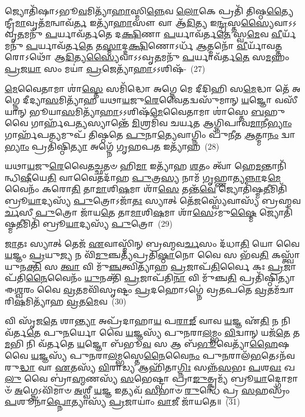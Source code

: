 𑌜𑍍𑌯𑍋𑌤𑌿᳴𑌷𑌾\-𑌽𑌭𑍂\-\ul{𑌵}\-𑌮𑌿𑌤𑍍𑌯𑌾᳴\-\ul{𑌹𑌾}\-𑌸𑍍𑌮𑌿\-\ul{𑌨𑍍𑌨𑍇}\-𑌵 \ul{𑌲𑍋}\-𑌕𑍇 𑌪𑍍𑌰𑌤𑌿᳴ 𑌤𑌿𑌷𑍍𑌠\-\ul{𑌤𑍍𑌯𑍈}\-𑌨𑍍𑌦𑍍𑌰𑍀\-\ul{𑌮𑌾}\-\-𑌵𑍃𑌤᳴\-\ul{𑌮}\-𑌨𑍍𑌵𑌾𑌵᳴\-\ul{𑌰𑍍𑌤} 𑌇𑌤𑍍𑌯𑌾᳴\-\ul{𑌹𑌾}\-𑌸𑍗 𑌵𑌾 𑌆᳴\-\ul{𑌦𑌿}\-𑌤𑍍𑌯 𑌇\-\ul{𑌨𑍍𑌦𑍍𑌰}\-𑌸𑍍𑌤\-\ul{𑌸𑍍𑌯𑍈}\-𑌵𑌾\-𑌽\-𑌽\-𑌵𑍃\-\ul{𑌤}\-𑌮𑌨𑍁᳴ \ul{𑌪}\-𑌰𑍍𑌯𑌾𑌵᳴𑌰𑍍𑌤𑌤𑍇 𑌦\-\ul{𑌕𑍍𑌷𑌿}\-𑌣𑌾 \ul{𑌪}\-𑌰𑍍𑌯𑌾𑌵᳴𑌰𑍍𑌤\-\ul{𑌤𑍇} 𑌸𑍍𑌵\-\ul{𑌮𑍇}\-𑌵 \ul{𑌵𑍀}\-𑌰𑍍𑌯᳴𑌮𑌨𑍁᳴ \ul{𑌪}\-𑌰𑍍𑌯𑌾𑌵᳴𑌰𑍍𑌤\-\ul{𑌤𑍇} 𑌤\-\ul{𑌸𑍍𑌮𑌾}\-𑌦𑍍𑌦\-\ul{𑌕𑍍𑌷𑌿}\-𑌣𑍋\-𑌽𑌰𑍍𑌧᳴ \ul{𑌆}\-𑌤𑍍𑌮𑌨𑍋᳴ \ul{𑌵𑍀}\-𑌰𑍍𑌯𑌾᳴𑌵\-\ul{𑌤𑍍𑌤}\-𑌰𑍋\-𑌽𑌥𑍋᳴ 𑌆\-\ul{𑌦𑌿}\-𑌤𑍍𑌯\-\ul{𑌸𑍍𑌯𑍈}\-𑌵𑌾\-𑌽\-𑌽𑌵𑍃\-\ul{𑌤}\-𑌮𑌨𑍁᳴ \ul{𑌪}\-𑌰𑍍𑌯𑌾𑌵᳴𑌰𑍍𑌤\-\ul{𑌤𑍇} 𑌸\-\ul{𑌮}\-𑌹𑌂 \ul{𑌪𑍍𑌰}\-𑌜\-\ul{𑌯𑌾} 𑌸𑌂 𑌮𑌯𑌾॑ \ul{𑌪𑍍𑌰}\-𑌜𑍇𑌤𑍍𑌯𑌾᳴\-\ul{𑌹𑌾}\-\-𑌽\-𑌽𑌶𑌿𑌷᳴-~(27)

\-\ul{𑌮𑍇}\-𑌵𑍈𑌤𑌾𑌮𑌾 𑌶𑌾॑\-\ul{𑌸𑍍𑌤𑍇} 𑌸𑌮𑌿᳴𑌦𑍍𑌧𑍋 𑌅𑌗𑍍𑌨𑍇 𑌮𑍇 𑌦𑍀𑌦𑌿𑌹𑌿 𑌸\-\ul{𑌮𑍇}\-𑌦𑍍𑌧𑌾 𑌤𑍇᳴ 𑌅𑌗𑍍𑌨𑍇 𑌦𑍀𑌦𑍍𑌯𑌾\-\ul{𑌸}\-𑌮𑌿𑌤𑍍𑌯𑌾᳴𑌹 𑌯𑌥𑌾\-\ul{𑌯}\-𑌜𑍁\-\ul{𑌰𑍇}\-𑌵𑍈𑌤𑌦𑍍𑌵𑌸𑍁᳴𑌮𑌾𑌨𑍍 \ul{𑌯}\-𑌜𑍍𑌞𑍋 𑌵𑌸𑍀᳴𑌯𑌾𑌨𑍍 𑌭𑍂𑌯𑌾\-\ul{𑌸}\-𑌮𑌿𑌤𑍍𑌯𑌾᳴\-\ul{𑌹𑌾}\-\-𑌽\-𑌽𑌶𑌿𑌷᳴\-\ul{𑌮𑍇}\-𑌵𑍈𑌤𑌾𑌮𑌾 𑌶𑌾॑𑌸𑍍𑌤𑍇 \ul{𑌬}\-𑌹𑍁 𑌵𑍈 𑌗𑌾𑌰𑍍\mbox{}𑌹᳴𑌪\-\ul{𑌤𑍍𑌯}\-𑌸𑍍𑌯𑌾𑌨𑍍𑌤𑍇᳴ \ul{𑌮𑌿}\-𑌶𑍍𑌰𑌮𑌿᳴𑌵 𑌚𑌰𑍍𑌯𑌤 𑌆𑌗𑍍𑌨𑌿𑌪𑌾𑌵\-\ul{𑌮𑌾}\-𑌨𑍀\-\ul{𑌭𑍍𑌯𑌾𑌂} 𑌗𑌾𑌰𑍍\mbox{}𑌹᳴𑌪\-\ul{𑌤𑍍𑌯}\-𑌮𑍁𑌪᳴ 𑌤𑌿𑌷𑍍𑌠𑌤𑍇 \ul{𑌪𑍁}\-𑌨𑌾\-\ul{𑌤𑍍𑌯𑍇}\-𑌵𑌾𑌗𑍍𑌨𑌿𑌂 𑌪𑍁᳴\-\ul{𑌨𑍀}\-𑌤 \ul{𑌆}\-𑌤𑍍𑌮𑌾\-\ul{𑌨𑌂} 𑌦𑍍𑌵𑌾\-\ul{𑌭𑍍𑌯𑌾𑌂} 𑌪𑍍𑌰𑌤𑌿᳴𑌷𑍍𑌠𑌿\-\ul{𑌤𑍍𑌯𑌾} 𑌅𑌗𑍍𑌨𑍇᳴ 𑌗𑍃𑌹𑌪\-\ul{𑌤} 𑌇𑌤𑍍𑌯𑌾᳴𑌹~(28)

𑌯𑌥𑌾\-\ul{𑌯}\-𑌜𑍁\-\ul{𑌰𑍇}\-𑌵𑍈𑌤\-\ul{𑌚𑍍𑌛}\-𑌤𑍞 𑌹𑌿\-\ul{𑌮𑌾} 𑌇𑌤𑍍𑌯𑌾᳴𑌹 \ul{𑌶}\-𑌤𑌂 𑌤𑍍𑌵𑌾᳴ 𑌹𑍇\-\ul{𑌮}\-𑌨𑍍𑌤𑌾𑌨𑌿᳴𑌨𑍍𑌧𑌿\-\ul{𑌷𑍀}\-𑌯𑍇\-\ul{𑌤𑌿} 𑌵𑌾𑌵𑍈𑌤𑌦𑌾᳴𑌹 \ul{𑌪𑍁}\-𑌤𑍍𑌰\-\ul{𑌸𑍍𑌯} 𑌨𑌾𑌮᳴ 𑌗𑍃𑌹𑍍𑌣𑌾𑌤𑍍𑌯\-\ul{𑌨𑍍𑌨𑌾}\-𑌦\-\ul{𑌮𑍇}\-𑌵𑍈𑌨𑌂᳴ 𑌕𑌰𑍋\-\ul{𑌤𑌿} 𑌤𑌾\-\ul{𑌮𑌾}\-𑌶𑌿\-\ul{𑌷}\-𑌮𑌾 𑌶𑌾᳴\-\ul{𑌸𑍇} 𑌤𑌨𑍍𑌤᳴\-\ul{𑌵𑍇} 𑌜𑍍𑌯𑍋𑌤𑌿᳴𑌷𑍍𑌮\-\ul{𑌤𑍀}\-𑌮𑌿𑌤𑌿᳴ 𑌬𑍍𑌰𑍂\-\ul{𑌯𑌾}\-𑌦𑍍𑌯𑌸𑍍𑌯᳴ \ul{𑌪𑍁}\-𑌤𑍍𑌰𑍋\-𑌽𑌜𑌾᳴\-\ul{𑌤𑌃} 𑌸𑍍𑌯𑌾𑌤𑍍 𑌤𑍇᳴\-\ul{𑌜}\-𑌸𑍍𑌵𑍍𑌯𑍇᳴𑌵𑌾𑌸𑍍𑌯᳴ 𑌬𑍍𑌰𑌹𑍍𑌮𑌵\-\ul{𑌰𑍍𑌚}\-𑌸𑍀 \ul{𑌪𑍁}\-𑌤𑍍𑌰𑍋 𑌜𑌾᳴𑌯\-\ul{𑌤𑍇} 𑌤𑌾\-\ul{𑌮𑌾}\-𑌶𑌿\-\ul{𑌷}\-𑌮𑌾 𑌶𑌾᳴\-\ul{𑌸𑍇}\-\-𑌽𑌮𑍁\-\ul{𑌷𑍍𑌮𑍈} 𑌜𑍍𑌯𑍋𑌤𑌿᳴𑌷𑍍𑌮\-\ul{𑌤𑍀}\-𑌮𑌿𑌤𑌿᳴ 𑌬𑍍𑌰𑍂\-\ul{𑌯𑌾}\-𑌦𑍍𑌯𑌸𑍍𑌯᳴ \ul{𑌪𑍁}\-𑌤𑍍𑌰𑍋~(29)

\-\ul{𑌜𑌾}\-𑌤𑌃 𑌸𑍍𑌯𑌾𑌤𑍍 𑌤𑍇𑌜᳴ \ul{𑌏}\-𑌵𑌾𑌸𑍍𑌮𑌿᳴𑌨𑍍 𑌬𑍍𑌰𑌹𑍍𑌮𑌵\-\ul{𑌰𑍍𑌚}\-𑌸𑌂 𑌦᳴𑌧𑌾\-\ul{𑌤𑌿} 𑌯𑍋 𑌵𑍈 \ul{𑌯}\-𑌜𑍍𑌞𑌂 \ul{𑌪𑍍𑌰}\-𑌯𑍁\-\ul{𑌜𑍍𑌯} 𑌨 𑌵𑌿᳴\-\ul{𑌮𑍁}\-𑌞𑍍𑌚𑌤𑍍𑌯᳴𑌪𑍍𑌰𑌤𑌿\-\ul{𑌷𑍍𑌠𑌾}\-𑌨𑍋 𑌵𑍈 𑌸 𑌭᳴𑌵\-\ul{𑌤𑌿} 𑌕𑌸𑍍𑌤𑍍𑌵𑌾᳴ 𑌯𑍁𑌨\-\ul{𑌕𑍍𑌤𑌿} 𑌸 \ul{𑌤𑍍𑌵𑌾} 𑌵𑌿 𑌮𑍁᳴\-\ul{𑌞𑍍𑌚}\-𑌤𑍍𑌵𑌿𑌤𑍍𑌯𑌾᳴𑌹 \ul{𑌪𑍍𑌰}\-𑌜𑌾𑌪᳴\-\ul{𑌤𑌿}\-𑌰𑍍𑌵𑍈 𑌕𑌃 \ul{𑌪𑍍𑌰}\-𑌜𑌾𑌪᳴𑌤𑌿\-\ul{𑌨𑍈}\-𑌵𑍈𑌨𑌂᳴ \ul{𑌯𑍁}\-𑌨𑌕𑍍𑌤𑌿᳴ \ul{𑌪𑍍𑌰}\-𑌜𑌾𑌪᳴𑌤𑌿\-\ul{𑌨𑌾} 𑌵𑌿 𑌮𑍁᳴𑌞𑍍𑌚\-\ul{𑌤𑌿} 𑌪𑍍𑌰𑌤𑌿᳴𑌷𑍍𑌠𑌿𑌤𑍍𑌯𑌾 𑌈\-\ul{𑌶𑍍𑌵}\-𑌰𑌂 𑌵𑍈 \ul{𑌵𑍍𑌰}\-𑌤𑌮𑌵𑌿᳴𑌸𑍃𑌷𑍍𑌟𑌂 \ul{𑌪𑍍𑌰}\-𑌦𑌹𑍋\-𑌽𑌗𑍍𑌨𑍇॑ 𑌵𑍍𑌰𑌤𑌪𑌤𑍇 \ul{𑌵𑍍𑌰}\-𑌤𑌮᳴𑌚𑌾𑌰𑌿\-\ul{𑌷}\-𑌮𑌿𑌤𑍍𑌯𑌾᳴𑌹 \ul{𑌵𑍍𑌰}\-𑌤\-\ul{𑌮𑍇}\-𑌵~(30)

𑌵𑌿 𑌸𑍃᳴𑌜\-\ul{𑌤𑍇} 𑌶𑌾\-\ul{𑌨𑍍𑌤𑍍𑌯𑌾} 𑌅𑌪𑍍𑌰᳴𑌦𑌾𑌹𑌾\-\ul{𑌯} 𑌪\-\ul{𑌰𑌾}\-\-\ul{𑌙𑍍} 𑌵𑌾𑌵 \ul{𑌯}\-𑌜𑍍𑌞 𑌏᳴\-\ul{𑌤𑌿} 𑌨 𑌨𑌿 𑌵᳴𑌰𑍍𑌤\-\ul{𑌤𑍇} 𑌪𑍁\-\ul{𑌨}\-𑌰𑍍𑌯𑍋 𑌵𑍈 \ul{𑌯}\-𑌜𑍍𑌞𑌸𑍍𑌯᳴ 𑌪𑍁𑌨𑌰𑌾\-\ul{𑌲}\-𑌮𑍍𑌭𑌂 \ul{𑌵𑌿}\-𑌦𑍍𑌵𑌾𑌨𑍍 𑌯𑌜᳴\-\ul{𑌤𑍇} 𑌤\-\ul{𑌮}\-𑌭𑌿 𑌨𑌿 𑌵᳴𑌰𑍍𑌤𑌤𑍇 \ul{𑌯}\-𑌜𑍍𑌞𑍋 𑌬᳴𑌭𑍂\-\ul{𑌵} 𑌸 𑌆 𑌬᳴\-\ul{𑌭𑍂}\-𑌵𑍇𑌤𑍍𑌯𑌾᳴\-\ul{𑌹𑍈}\-𑌷 𑌵𑍈 \ul{𑌯}\-𑌜𑍍𑌞𑌸𑍍𑌯᳴ 𑌪𑍁𑌨𑌰𑌾\-\ul{𑌲}\-𑌮𑍍𑌭𑌸𑍍𑌤𑍇\-\ul{𑌨𑍈}\-𑌵𑍈\-\ul{𑌨𑌂} 𑌪𑍁\-\ul{𑌨}\-𑌰𑌾𑌲᳴\-\ul{𑌭}\-𑌤𑍇\-𑌽𑌨᳴𑌵𑌰𑍁\-\ul{𑌦𑍍𑌧𑌾} 𑌵𑌾 \ul{𑌏}\-𑌤𑌸𑍍𑌯᳴ \ul{𑌵𑌿}\-𑌰𑌾𑌡𑍍𑌯 𑌆𑌹𑌿᳴𑌤𑌾\-\ul{𑌗𑍍𑌨𑌿𑌃} 𑌸𑌨𑍍𑌨᳴\-\ul{𑌸}\-𑌭𑌃 \ul{𑌪}\-𑌶\-\ul{𑌵𑌃} 𑌖\-\ul{𑌲𑍁} 𑌵𑍈 𑌬𑍍𑌰𑌾॑\-\ul{𑌹𑍍𑌮}\-𑌣𑌸𑍍𑌯᳴ \ul{𑌸}\-𑌭𑍇𑌷𑍍𑌟𑍍𑌵𑌾 𑌪𑍍𑌰𑌾\-\ul{𑌙𑍁}\-𑌤𑍍𑌕𑍍𑌰𑌮𑍍𑌯᳴ 𑌬𑍍𑌰𑍂\-\ul{𑌯𑌾}\-𑌦𑍍𑌗𑍋𑌮𑌾𑍞᳴ \ul{𑌅}\-𑌗𑍍𑌨𑍇\-𑌽𑌵𑌿᳴𑌮𑌾𑍞 \ul{𑌅}\-𑌶𑍍𑌵𑍀 \ul{𑌯}\-𑌜𑍍𑌞 𑌇𑌤𑍍𑌯𑌵᳴ \ul{𑌸}\-𑌭𑌾𑍞 \ul{𑌰𑍁}\-𑌨𑍍𑌧𑍇 𑌪𑍍𑌰 \ul{𑌸}\-𑌹𑌸𑍍𑌰𑌂᳴ \ul{𑌪}\-𑌶𑍂𑌨𑌾॑\-\ul{𑌪𑍍𑌨𑍋}\-𑌤𑍍𑌯𑌾𑌸𑍍𑌯᳴ \ul{𑌪𑍍𑌰}\-𑌜𑌾𑌯𑌾𑌂॑ \ul{𑌵𑌾}\-𑌜𑍀 𑌜𑌾᳴𑌯𑌤𑍇॥~(31)

